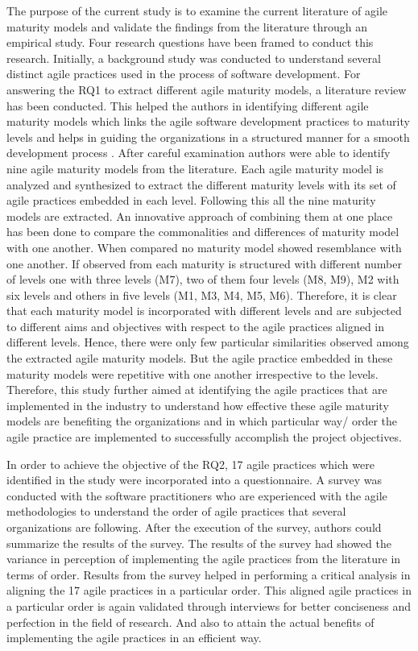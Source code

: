 \documentclass[a4paper,oneside]{bth}
\begin{document}
The purpose of the current study is to examine the current literature of agile maturity models and validate the findings from the literature through an empirical study. Four research questions have been framed to conduct this research. Initially, a background study was conducted to understand several distinct agile practices used in the process of software development. For answering the RQ1 to extract different agile maturity models, a literature review has been conducted. This helped the authors in identifying different agile maturity models which links the agile software development practices to maturity levels and helps in guiding the organizations in a structured manner for a smooth development process \cite{selleri_silva_reference_2014}. After careful examination authors were able to identify nine agile maturity models from the literature. Each agile maturity model is analyzed and synthesized to extract the different maturity levels with its set of agile practices embedded in each level. Following this all the nine maturity models are extracted. An innovative approach of combining them at one place has been done to compare the commonalities and differences of maturity model with one another. When compared no maturity model showed resemblance with one another. If observed from each maturity is structured with different number of levels one with three levels (M7), two of them four levels (M8, M9), M2 with six levels and others in five levels (M1, M3, M4, M5, M6). Therefore, it is clear that each maturity model is incorporated with different levels and are subjected to different aims and objectives with respect to the agile practices aligned in different levels. Hence, there were only few particular similarities observed among the extracted agile maturity models. But the agile practice embedded in these maturity models were repetitive with one another irrespective to the levels. Therefore, this study further aimed at identifying the agile practices that are implemented in the industry to understand how effective these agile maturity models are benefiting the organizations and in which particular way/ order the agile practice are implemented to successfully accomplish the project objectives.

In order to achieve the objective of the RQ2, 17 agile practices which were identified in the study were incorporated into a questionnaire. A survey was conducted with the software practitioners who are experienced with the agile methodologies to understand the order of agile practices that several organizations are following. After the execution of the survey, authors could summarize the results of the survey. The results of the survey had showed the variance in perception of implementing the agile practices from the literature in terms of order. Results from the survey helped in performing a critical analysis in aligning the 17 agile practices in a particular order. This aligned agile practices in a particular order is again validated through interviews for better conciseness and perfection in the field of research. And also to attain the actual benefits of implementing the agile practices in an efficient way.
\end{document}

